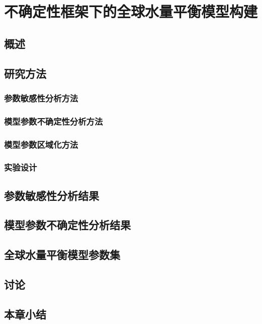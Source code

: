 \chapter{不确定性框架下的全球水量平衡模型构建}
\label{chap:params_regionalization}

\section{概述}

\section{研究方法}

\subsection{参数敏感性分析方法}

\subsection{模型参数不确定性分析方法}

\subsection{模型参数区域化方法}

\subsection{实验设计}

\section{参数敏感性分析结果}

\section{模型参数不确定性分析结果}

\section{全球水量平衡模型参数集}

\section{讨论}

\section{本章小结}

\clearpage